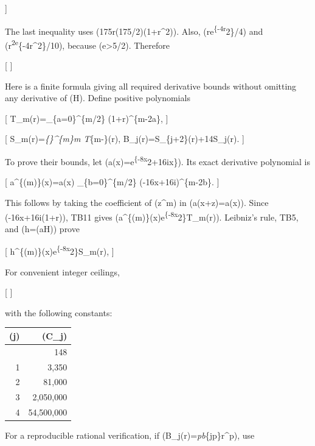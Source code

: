 \documentclass[
]{article}
\newcounter{none} %
\begin{document}
{]}

The last inequality uses (175r\le(175/2)(1+r\^{}2)). Also,
(re\textsuperscript{\{-4r}2\}/4) and
(r\textsuperscript{2e}\{-4r\^{}2\}/10), because (e\textgreater5/2).
Therefore

{[}   {]}

Here is a finite formula giving all required derivative bounds without
omitting any derivative of (H). Define positive polynomials

{[} T\_m(r)=\sum\_\{a=0\}\^{}\{\lfloor m/2\rfloor\}
(1+r)\^{}\{m-2a\}, {]}

{[} S\_m(r)=\sum\emph{\{\}\^{}\{m\}\binom m\ell
{}T}\{m-\ell\}(r),\qquad
B\_j(r)=S\_\{j+2\}(r)+\frac14S\_j(r).  {]}

To prove their bounds, let (a(x)=e\textsuperscript{\{-8x}2+16ix\}). Its
exact derivative polynomial is

{[} a\^{}\{(m)\}(x)=a(x) \sum\_\{b=0\}\^{}\{\lfloor m/2\rfloor\}
(-16x+16i)\^{}\{m-2b\}.  {]}

This follows by taking the coefficient of (z\^{}m) in
(a(x+z)=a(x)\exp[(-16x+16i)z-8z^2]). Since
(\textbar-16x+16i\textbar{}(1+r)), TB11 gives
(\textbar a\^{}\{(m)\}(x)\textbar{}\le e\textsuperscript{\{-8x}2\}T\_m(r)).
Leibniz's rule, TB5, and (h=\Re(aH)) prove

{[}
\textbar h\^{}\{(m)\}(x)\textbar{}\le e\textsuperscript{\{-8x}2\}S\_m(r),\qquad
{}  {]}

For convenient integer ceilings,

{[}  
{]}

with the following constants:

{\def\LTcaptype{none} %
\begin{longtable}[]{@{}rr@{}}
\toprule\noalign{}
(j) & (C\_j) \\
\midrule\noalign{}
\endhead
\bottomrule\noalign{}
\endlastfoot
0 & 148 \\
1 & 3,350 \\
2 & 81,000 \\
3 & 2,050,000 \\
4 & 54,500,000 \\
\end{longtable}
}

For a reproducible rational verification, if
(B\_j(r)=\sum\emph{pb}\{jp\}r\^{}p), use
\end{document}
